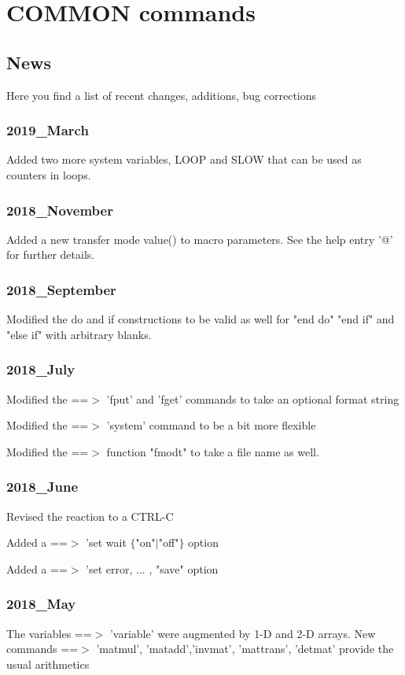\chapter{COMMON commands}
\section{News}
\par
Here you find a list of recent changes, additions, bug corrections 
\subsection*{2019\_March}
\par
Added two more system variables, LOOP and SLOW that can be 
used as counters in loops. 
\subsection*{2018\_November}
\par
Added a new transfer mode value() to macro parameters. See the 
help entry '@' for further details. 
\subsection*{2018\_September}
\par
Modified the do and if constructions to be valid as well for 
"end do" "end if" and "else if" with arbitrary blanks. 
\subsection*{2018\_July}
\par
Modified the ==$> $ 'fput' and 'fget' commands to take an optional 
    format string 
\par
Modified the ==$> $ 'system' command to be a bit more flexible 
\par
Modified the ==$> $ function "fmodt" to take a file name as well. 
\subsection*{2018\_June}
\par
Revised the reaction to a CTRL-C 
\par
Added a ==$> $ 'set wait $ \{$"on"$| $"off"$\} $ option 
\par
Added a ==$> $ 'set error, ... , "save" option 
\subsection*{2018\_May}
\par
The variables ==$> $ 'variable' were augmented by 1-D and 2-D arrays. 
New commands ==$> $ 'matmul', 'matadd','invmat', 'mattrans', 
'detmat' provide the usual arithmetics 
